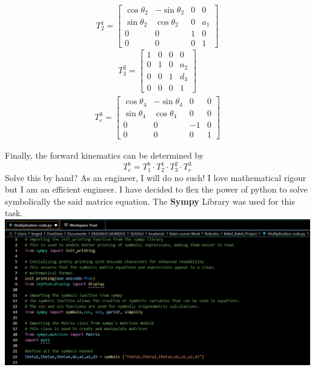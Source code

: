 \documentclass[12pt]{report}
\begin{document}
\begin{equation}
	T_2^1=\left[\begin{array}{cccc}
			\cos \theta_2 & -\sin \theta_2 & 0 & 0 \\
			\sin \theta_2 & \cos \theta_2 & 0 & a_1 \\
			0 & 0 & 1 & 0 \\
			0 & 0 & 0 & 1
		\end{array}\right]
\end{equation}
\begin{equation}
	\begin{aligned}
		T_3^2=\left[\begin{array}{llll}
			1 & 0 & 0 & 0 \\
			0 & 1 & 0 & a_2 \\
			0 & 0 & 1 & d_3 \\
			0 & 0 & 0 & 1
		\end{array}\right]
	\end{aligned}
\end{equation}
\begin{equation}
	\begin{aligned}
		 T_e^3=\left[\begin{array}{cccc}
			\cos \theta_4 & -\sin \theta_4 & 0 & 0 \\
			\sin \theta_4 & \cos \theta_4 & 0 & 0 \\
			0 & 0 & -1 & 0 \\
			0 & 0 & 0 & 1
		\end{array}\right] 
	\end{aligned}
\end{equation}

Finally, the forward kinematics can be determined by
	\begin{equation} 
	T^b_e = T^b_1\cdot T^1_2\cdot T^2_3\cdot T^3_e 
\end{equation}
Solve this by hand? As an engineer, I will do no such!
I love mathematical rigour but I am an efficient engineer.
I have decided to flex the power of python to solve symbolically the said matrics equation. The \textbf{Sympy} Library was used for this task.\\

\hspace{-20mm} 
	\includegraphics[scale = 0.72]{P1}
	
\end{document}
